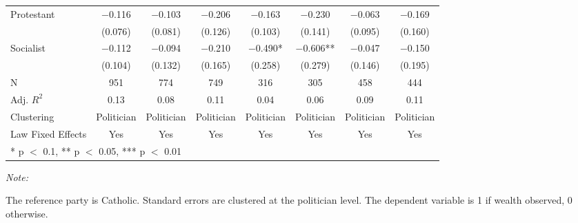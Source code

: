 \begin{table}[!h]
{\begin{threeparttable}
\begin{tabular}[t]{lccccccc}
Protestant & \num{-0.116} & \num{-0.103} & \num{-0.206} & \num{-0.163} & \num{-0.230} & \num{-0.063} & \num{-0.169}\\
 & (\num{0.076}) & (\num{0.081}) & (\num{0.126}) & (\num{0.103}) & (\num{0.141}) & (\num{0.095}) & (\num{0.160})\\
Socialist & \num{-0.112} & \num{-0.094} & \num{-0.210} & \num{-0.490}* & \num{-0.606}** & \num{-0.047} & \num{-0.150}\\
 & (\num{0.104}) & (\num{0.132}) & (\num{0.165}) & (\num{0.258}) & (\num{0.279}) & (\num{0.146}) & (\num{0.195})\\
\midrule
N & \num{951} & \num{774} & \num{749} & \num{316} & \num{305} & \num{458} & \num{444}\\
Adj. $R^2$ & \num{0.13} & \num{0.08} & \num{0.11} & \num{0.04} & \num{0.06} & \num{0.09} & \num{0.11}\\
Clustering & Politician & Politician & Politician & Politician & Politician & Politician & Politician\\
Law Fixed Effects & Yes & Yes & Yes & Yes & Yes & Yes & Yes\\
\bottomrule
\multicolumn{8}{l}{\rule{0pt}{1em}* p $<$ 0.1, ** p $<$ 0.05, *** p $<$ 0.01}\\
\end{tabular}
\begin{tablenotes}[para]
\item \textit{Note: } 
\item The reference party is Catholic. Standard errors are clustered at the politician level. The dependent variable is 1 if wealth observed, 0 otherwise.
\end{tablenotes}
\end{threeparttable}}
\end{table}
